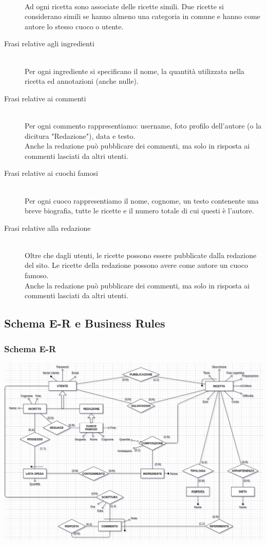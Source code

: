 \documentclass[12pt]{extarticle}
\begin{document}
\begin{description}
    \\ Ad ogni ricetta sono associate delle ricette simili. Due ricette si considerano simili se hanno almeno una categoria in comune e hanno come autore lo stesso cuoco o utente.
    \item[Frasi relative agli ingredienti] \hfill
    \\ Per ogni ingrediente si specificano il nome, la quantità utilizzata nella ricetta ed annotazioni (anche nulle).
    \item[Frasi relative ai commenti] \hfill
    \\ Per ogni commento rappresentiamo: username, foto profilo dell'autore (o la dicitura "Redazione"), data e testo.
    \\ Anche la redazione può pubblicare dei commenti, ma solo in risposta ai commenti lasciati da altri utenti.    
    \item[Frasi relative ai cuochi famosi] \hfill
    \\ Per ogni cuoco rappresentiamo il nome, cognome, un testo contenente una breve biografia, tutte le ricette e il numero totale di cui questi è l'autore.
    \item[Frasi relative alla redazione] \hfill  
    \\ Oltre che dagli utenti, le ricette possono essere pubblicate dalla redazione del sito. Le ricette della redazione possono avere come autore un cuoco famoso.
    \\ Anche la redazione può pubblicare dei commenti, ma solo in risposta ai commenti lasciati da altri utenti.    
\end{description}

\newpage

\subsection{Schema E-R e Business Rules}
\subsubsection{Schema E-R}

\includegraphics[width=\textwidth]{er1.png}
\end{document}
